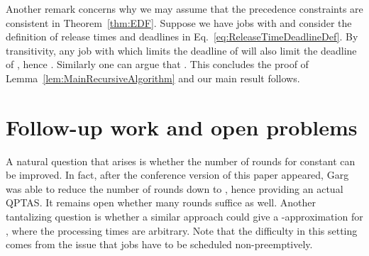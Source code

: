 \documentclass[11pt,letterpaper,oneside,english]{article}
\theoremstyle{theorem}
\begin{document}
Another remark concerns why we may assume that the precedence constraints are consistent in 
Theorem~\ref{thm:EDF}. 
Suppose we have jobs  with  and consider the definition of release times and
deadlines in Eq.~\ref{eq:ReleaseTimeDeadlineDef}. By transitivity, any job  with  which limits the deadline
of  will also limit the deadline of , hence . Similarly one can argue
that .
This concludes the proof of Lemma~\ref{lem:MainRecursiveAlgorithm}
and our main result follows. 

\section{Follow-up work and open problems}

A natural question that arises is whether the number of 
rounds for constant  can be improved. In fact, after the conference version of this
paper appeared, Garg~\cite{QPTAS-Scheduling-GargArxiv2017} was able to reduce the number of rounds down 
to , hence providing an actual QPTAS. It remains open whether  many rounds
suffice as well. Another tantalizing question is whether a similar approach could give a -approximation for , where the processing times  are arbitrary. Note that the
difficulty in this setting comes from the issue that jobs have to be scheduled non-preemptively.
\end{document}
